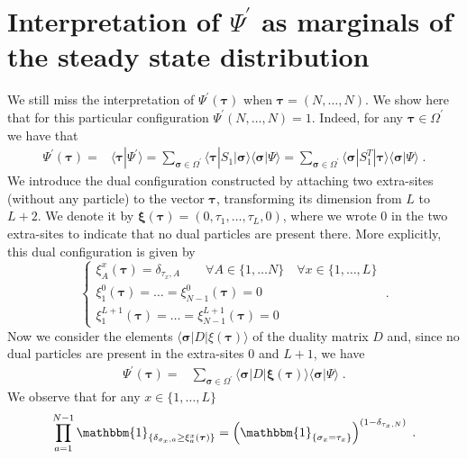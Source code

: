 \documentclass[10pt]{article}
\numberwithin{equation}{section}
\numberwithin{equation}{subsection}
\newcommand{\dt}{\;.}
\begin{document}
{\section{Interpretation of $\Psi^{'}$ as marginals of the steady state distribution}\label{subsection-interpretationPSIp} 
We still miss the interpretation of $\Psi^{'}(\bm{\tau})$ when  $\bm{\tau}= (N,\ldots,N)$. We show here that for this particular configuration
$\Psi^{'}(N,\ldots,N) =1$. Indeed, for any $\bm{\tau}\in \Omega^{'}$ we have that 
\begin{align}
	\Psi^{'}(\bm{\tau})=&\langle\bm{\tau}|\Psi^{'}\rangle=\sum_{\bm{\sigma}\in \Omega^{'}}\langle \bm{\tau}|S_{1}|\bm{\sigma}\rangle\langle \bm{\sigma}|\Psi\rangle=\sum_{\bm{\sigma}\in \Omega^{'}}\langle \bm{\sigma}|S_{1}^{T}|\bm{\tau}\rangle\langle \bm{\sigma}|\Psi\rangle\dt
\end{align} 
{\color{black}We introduce the dual configuration constructed by attaching two extra-sites (without any particle) to the vector $\bm{\tau}$, transforming its dimension from $L$ to $L+2$. We denote it by $\bm{\xi}(\bm{\tau})=(0,\tau_{1},\ldots,\tau_{L},0)$, where we wrote $0$ in the two extra-sites to indicate that no dual particles are present there.}  More explicitly, this dual configuration is given by
\begin{equation}
	\begin{cases}
		\xi_{A}^{x}(\bm{\tau})= \delta_{\tau_{x},A}\qquad \forall A\in \{1,\ldots N\}\quad \forall x\in \{1,\ldots,L\}\\
		\xi_{1}^{0}(\bm{\tau})=\ldots=\xi_{N-1}^{0}(\bm{\tau})=0\\
		\xi_{1}^{L+1}(\bm{\tau})=\ldots=\xi_{N-1}^{L+1}(\bm{\tau})=0
	\end{cases}\dt
\end{equation} Now we consider the elements $\langle\bm{\sigma}|D|\xi(\bm{\tau})\rangle$ of the duality matrix $D$ and, {\color{black} since no dual particles are present in the extra-sites $0$ and $L+1$}, we have
\begin{align}\label{useful-InInterpretation}
	\Psi^{'}(\bm{\tau})=&\sum_{\bm{\sigma}\in \Omega^{'}}\langle \bm{\sigma}|D|\bm{\xi}(\bm{\tau})\rangle\langle \bm{\sigma}|\Psi\rangle\dt
\end{align}
We observe that for any $x\in \{1,\ldots,L\}$
\begin{equation}
	\prod_{a=1}^{N-1}\mathbbm{1}_{\{\delta_{\sigma_{x},a}\geq\xi_{a}^{x}(\bm{\tau})\}}=\left(\mathbbm{1}_{\{\sigma_{x}=\tau_{x}\}}\right)^{(1-\delta_{\tau_{x},N})}\dt
\end{equation}
}
\end{document}
